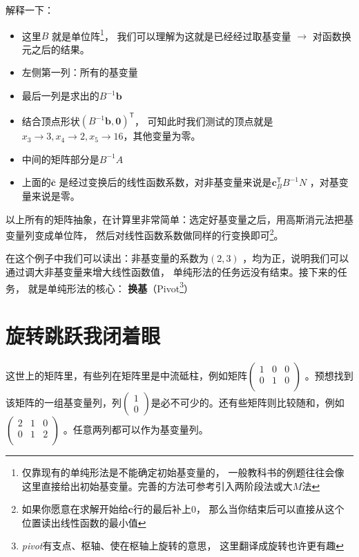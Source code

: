 \documentclass{../mathnotes-art}
\renewcommand{\c}{\mathbf{c}}
\renewcommand{\b}{\mathbf{b}}
\begin{document}
解释一下：
\begin{itemize}
    \item 这里\(B\) 就是单位阵\footnote{仅靠现有的单纯形法是不能确定初始基变量的，
        一般教科书的例题往往会像这里直接给出初始基变量。完善的方法可参考引入两阶段法或大\(M\)法}，
        我们可以理解为这就是已经经过取基变量 \(\to \) 对函数换元之后的结果。
    \item 左侧第一列：所有的基变量
    \item 最后一列是求出的\(B^{-1}\b\)
    \item 结合顶点形状\((B^{-1}\b, \mathbf{0})^{\mathsf{T}}\)，
        可知此时我们测试的顶点就是\(x_{3} \to 3,
        x_{4} \to 2, x_{5} \to 16\)，其他变量为零。
    \item 中间的矩阵部分是\(B^{-1}A\)
    \item 上面的\(\bar{\c}\) 是经过变换后的线性函数系数，对非基变量来说是\(\c_{B}^{\mathsf{T}}
        B^{-1} N\) ，对基变量来说是零。
\end{itemize}

以上所有的矩阵抽象，在计算里非常简单：选定好基变量之后，用高斯消元法把基变量列变成单位阵，
然后对线性函数系数做同样的行变换即可\footnote{如果你愿意在求解开始给\(\c\)行的最后补上\(0\)，
那么当你结束后可以直接从这个位置读出线性函数的最小值}。

在这个例子中我们可以读出：非基变量的系数为\((2,3)\) ，均为正，说明我们可以通过调大非基变量来增大线性函数值，
单纯形法的任务远没有结束。接下来的任务，
就是单纯形法的核心：
\textbf{换基}（Pivot\footnote{\textit{pivot}有支点、枢轴、使在枢轴上旋转的意思，
这里翻译成旋转也许更有趣}）

\section{旋转跳跃我闭着眼}

这世上的矩阵里，有些列在矩阵里是中流砥柱，例如矩阵\(
    \begin{pmatrix}
        1 & 0 & 0 \\
        0 & 1 & 0 \\
\end{pmatrix}\) 。预想找到该矩阵的一组基变量列，列\(
    \begin{pmatrix}
        1 \\ 0
\end{pmatrix}\)是必不可少的。还有些矩阵则比较随和，例如\(
    \begin{pmatrix}
        2 & 1 & 0 \\
        0 & 1 & 2 \\
\end{pmatrix}\) 。任意两列都可以作为基变量列。
\end{document}
